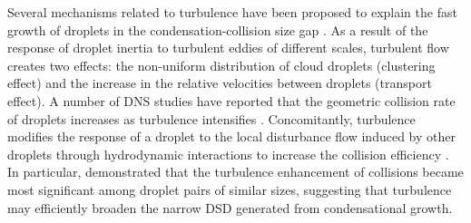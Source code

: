 Several mechanisms related to turbulence have been proposed to explain the fast growth of droplets in the condensation-collision size gap \citep{Devenish2012,Grabowski2013}. As a result of the response of droplet inertia to turbulent eddies of different scales, turbulent flow creates two effects: the non-uniform distribution of cloud droplets (clustering effect) and the increase in the relative velocities between droplets (transport effect). A number of DNS studies have reported that the geometric collision rate of droplets increases as turbulence intensifies \citep{Franklin2005, Ayala2008a,Onishi2016}. Concomitantly, turbulence modifies the response of a droplet to the local disturbance flow induced by other droplets through hydrodynamic interactions to increase the collision efficiency \citep{Wang2008, Onishi2013, Chen2018}. In particular, \citet{Chen2018} demonstrated that the turbulence enhancement of collisions became most significant among droplet pairs of similar sizes, suggesting that turbulence may efficiently broaden the narrow DSD generated from condensational growth.

